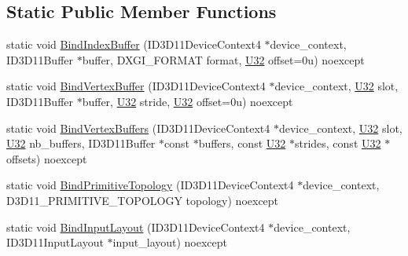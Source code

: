 \subsection*{Static Public Member Functions}
\begin{DoxyCompactItemize}
\item 
static void \hyperlink{structmage_1_1_pipeline_1_1_i_a_a93bfdb872e9f2ed8d7530d2096d19612}{Bind\+Index\+Buffer} (I\+D3\+D11\+Device\+Context4 $\ast$device\+\_\+context, I\+D3\+D11\+Buffer $\ast$buffer, D\+X\+G\+I\+\_\+\+F\+O\+R\+M\+AT format, \hyperlink{namespacemage_a41c104c036fba3756a74e19f793eeaa1}{U32} offset=0u) noexcept
\item 
static void \hyperlink{structmage_1_1_pipeline_1_1_i_a_a3baadb42f3ed9d721e5b631cdf42fcd4}{Bind\+Vertex\+Buffer} (I\+D3\+D11\+Device\+Context4 $\ast$device\+\_\+context, \hyperlink{namespacemage_a41c104c036fba3756a74e19f793eeaa1}{U32} slot, I\+D3\+D11\+Buffer $\ast$buffer, \hyperlink{namespacemage_a41c104c036fba3756a74e19f793eeaa1}{U32} stride, \hyperlink{namespacemage_a41c104c036fba3756a74e19f793eeaa1}{U32} offset=0u) noexcept
\item 
static void \hyperlink{structmage_1_1_pipeline_1_1_i_a_a1c9c3a65014815a94a5c4f69809201b9}{Bind\+Vertex\+Buffers} (I\+D3\+D11\+Device\+Context4 $\ast$device\+\_\+context, \hyperlink{namespacemage_a41c104c036fba3756a74e19f793eeaa1}{U32} slot, \hyperlink{namespacemage_a41c104c036fba3756a74e19f793eeaa1}{U32} nb\+\_\+buffers, I\+D3\+D11\+Buffer $\ast$const $\ast$buffers, const \hyperlink{namespacemage_a41c104c036fba3756a74e19f793eeaa1}{U32} $\ast$strides, const \hyperlink{namespacemage_a41c104c036fba3756a74e19f793eeaa1}{U32} $\ast$offsets) noexcept
\item 
static void \hyperlink{structmage_1_1_pipeline_1_1_i_a_ae3063a8930a91dcb7b94bcdaa866e93f}{Bind\+Primitive\+Topology} (I\+D3\+D11\+Device\+Context4 $\ast$device\+\_\+context, D3\+D11\+\_\+\+P\+R\+I\+M\+I\+T\+I\+V\+E\+\_\+\+T\+O\+P\+O\+L\+O\+GY topology) noexcept
\item 
static void \hyperlink{structmage_1_1_pipeline_1_1_i_a_ae9aa0db517b6ab2fa56d30e4dbc804e7}{Bind\+Input\+Layout} (I\+D3\+D11\+Device\+Context4 $\ast$device\+\_\+context, I\+D3\+D11\+Input\+Layout $\ast$input\+\_\+layout) noexcept
\end{DoxyCompactItemize}
